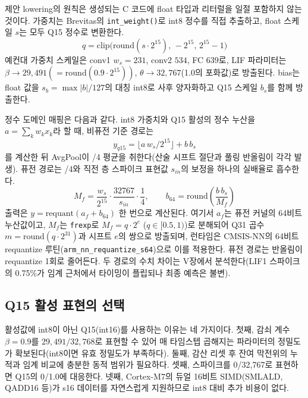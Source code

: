 제안 lowering의 원칙은 생성되는 C 코드에 float 타입과 리터럴을 일절 포함하지 않는 것이다. 가중치는 Brevitas의 \texttt{int\_weight()}로 int8 정수를 직접 추출하고, float 스케일 $s$는 모두 Q15 정수로 변환한다.
\begin{equation}
q = \mathrm{clip}\bigl(\mathrm{round}(s\cdot 2^{15}),\,-2^{15},\,2^{15}{-}1\bigr)
\label{eq:q15}
\end{equation}
예컨대 가중치 스케일은 conv1 $w_s{=}231$, conv2 $534$, FC $639$로, LIF 파라미터는 $\beta\rightarrow29{,}491(=\mathrm{round}(0.9\cdot2^{15}))$, $\theta\rightarrow32{,}767$(1.0의 포화값)로 방출된다. bias는 float 값을 $s_b=\max|b|/127$의 대칭 int8로 사후 양자화하고 Q15 스케일 $b_s$를 함께 방출한다.

정수 도메인 매핑은 다음과 같다. int8 가중치와 Q15 활성의 정수 누산을 $a=\sum_k w_k x_k$라 할 때, 비퓨전 기준 경로는
\begin{equation}
y_{q15} = \bigl\lfloor a\, w_s / 2^{15} \bigr\rfloor + b\, b_s
\label{eq:map-unfused}
\end{equation}
를 계산한 뒤 AvgPool이 /4 평균을 취한다(산술 시프트 절단과 풀링 반올림이 각각 발생). 퓨전 경로는 /4와 직전 층 스파이크 표현값 $s_{in}$의 보정을 하나의 실배율로 흡수한다.
\begin{equation}
M_f = \frac{w_s}{2^{15}} \cdot \frac{32767}{s_{in}} \cdot \frac{1}{4},\qquad
b_{64} = \mathrm{round}\!\left(\frac{b\, b_s}{M_f}\right)
\label{eq:mfused}
\end{equation}
출력은 $y=\mathrm{requant}(a_f+b_{64})$ 한 번으로 계산된다. 여기서 $a_f$는 퓨전 커널의 64비트 누산값이고, $M_f$는 \texttt{frexp}로 $M_f=q\cdot2^{e}$ ($q\in[0.5,1)$)로 분해되어 Q31 곱수 $m=\mathrm{round}(q\cdot2^{31})$과 시프트 $e$의 쌍으로 방출되며, 런타임은 CMSIS-NN의 64비트 requantize 루틴(\texttt{arm\_nn\_requantize\_s64})으로 이를 적용한다. 퓨전 경로는 반올림이 requantize 1회로 줄어든다. 두 경로의 수치 차이는 V장에서 분석한다(LIF1 스파이크의 0.75\%가 임계 근처에서 타이밍이 플립되나 최종 예측은 불변).

\subsection{Q15 활성 표현의 선택}\label{sec:compiler-q15}

활성값에 int8이 아닌 Q15(int16)를 사용하는 이유는 네 가지이다. 첫째, 감쇠 계수 $\beta=0.9$를 $29{,}491/32{,}768$로 표현할 수 있어 매 타임스텝 곱해지는 파라미터의 정밀도가 확보된다(int8이면 유효 정밀도가 부족하다). 둘째, 감산 리셋 후 잔여 막전위의 누적과 임계 비교에 충분한 동적 범위가 필요하다. 셋째, 스파이크를 0/32,767로 표현하면 Q15의 0/1.0에 대응한다. 넷째, Cortex-M7의 듀얼 16비트 SIMD(SMLALD, QADD16 등)가 s16 데이터를 자연스럽게 지원하므로 int8 대비 추가 비용이 없다.

